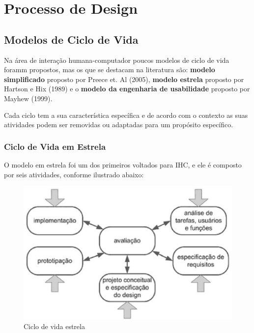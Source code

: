 \chapter[Processo de Design]{Processo de Design}

\section{Modelos de Ciclo de Vida}

Na área de interação humana-computador poucos modelos de ciclo de vida foramm propostos, mas os que se destacam na literatura são: \textbf{modelo simplificado} proposto por Preece et. Al (2005), \textbf{modelo estrela} proposto por Hartson e Hix (1989) e o \textbf{modelo da engenharia de usabilidade} proposto por Mayhew (1999).

Cada ciclo tem a sua característica específica e de acordo com o contexto as suas atividades podem ser removidas ou adaptadas para um propósito específico.

\subsection{Ciclo de Vida em Estrela}
O modelo em estrela foi um dos primeiros voltados para IHC, e ele é composto por seis atividades, conforme ilustrado abaixo:

\begin{figure}[H]
	\centering
	\includegraphics[scale=0.5]{figuras/modelo_estrela.eps}
	\caption{Ciclo de vida estrela}
\end{figure}

